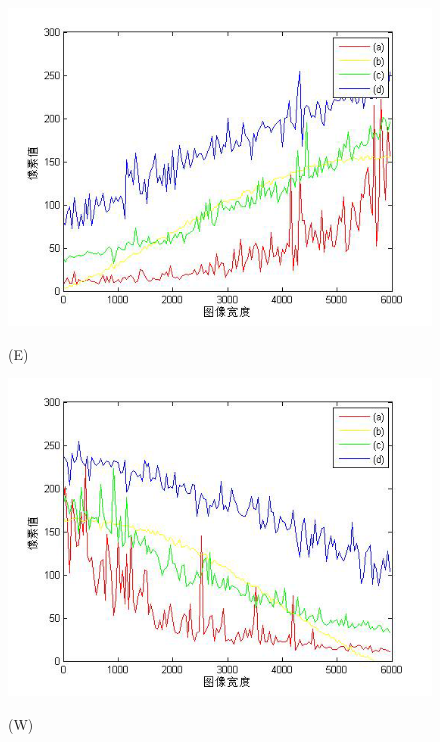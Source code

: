 \begin{figure}[htbp]

\begin{minipage}{0.48\linewidth}
\centerline{\includegraphics[width=1\linewidth]{figures/guangxianshuaijianduibituchuzhie.png}}
\centerline{(E)}
\end{minipage}
\begin{minipage}{0.48\linewidth}
\centerline{\includegraphics[width=1\linewidth]{figures/guangxianshuaijianduibituchuzhiw.png}}
\centerline{(W)}
\end{minipage}



\end{figure}
